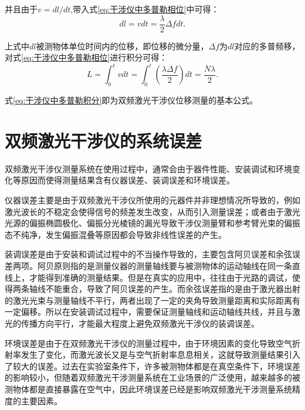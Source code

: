 并且由于\(v=dl / dt\),带入式\eqref{eq:干涉仪中多普勒相位}中可得：
\begin{equation}\label{eq:干涉仪中多普勒位移微分}
  dl = vdt = \frac{\lambda}{2}\Delta f dt.
\end{equation}

上式中\(dl\)被测物体单位时间内的位移，即位移的微分量，\(\Delta f\)为\(dl\)对应的多普频移，对式\eqref{eq:干涉仪中多普勒相位}进行积分可得：
\begin{equation}\label{eq:干涉仪中多普勒积分}
  L = \int_{0}^{t} vdt =\int_{0}^{t} (\frac{\lambda \Delta f}{2})dt = \frac{N\lambda}{2}.
\end{equation}

式\eqref{eq:干涉仪中多普勒积分}即为双频激光干涉仪位移测量的基本公式\cite{丁子婷双频激光干涉仪测量系统的环境误差研究}。

\section{双频激光干涉仪的系统误差}
双频激光干涉仪测量系统在使用过程中，通常会由于器件性能、安装调试和环境变化等原因而使得测量结果含有仪器误差、装调误差和环境误差。

仪器误差主要是由于双频激光干涉仪所使用的元器件并非理想情况所导致的，例如激光波长的不稳定会使得信号的频差发生改变，从而引入测量误差；或者由于激光光源的偏振椭圆极化、偏振分光棱镜的漏光导致干涉仪测量臂和参考臂光束的偏振态不纯净，发生偏振混叠等原因都会导致非线性误差的产生\cite{2014双频激光干涉仪非线性误差测量技术研究}。

装调误差是由于安装和调试过程中的不当操作导致的，主要包含阿贝误差和余弦误差两项。阿贝原则指的是测量仪器的测量轴线要与被测物体的运动轴线在同一条直线上，才能得到准确的测量结果。但是在真实的应用中，往往由于光路的调试，使得两条轴线不能重合，导致了阿贝误差的产生\cite{2022Astudyon}。而余弦误差指的是由于激光器出射的激光光束与测量轴线不平行，两者出现了一定的夹角导致测量距离和实际距离有一定偏移。所以在安装调试过程中，需要保证测量轴线和运动轴线共线，并且与激光的传播方向平行，才能最大程度上避免双频激光干涉仪的装调误差。

环境误差是由于在双频激光干涉仪的测量过程中，由于环境因素的变化导致空气折射率发生了变化，而激光波长又是与空气折射率息息相关，这就导致测量结果引入了较大的误差。过去在实验室条件下，许多被测物体都是在真空条件下，环境误差的影响较小，但随着双频激光干涉测量系统在工业场景的广泛使用，越来越多的被测物体都是直接暴露在空气中，因此环境误差已经是影响双频激光干涉测量系统精度的主要因素\cite{2023外差干涉测量系统主要误差源的分析与抑制技术研究}。

